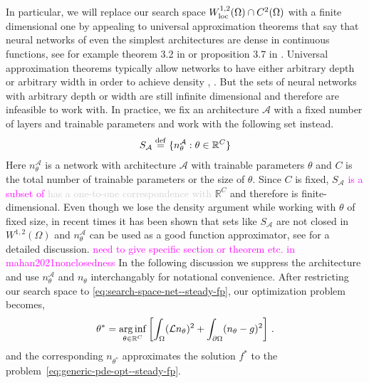 In particular, we will replace our search space $W^{1,2}_{\rm loc}(\Omega)\cap  C^2(\Omega)$ with a finite dimensional one by appealing to universal approximation theorems that say that neural networks of even the simplest architectures are dense in continuous functions, see for example theorem 3.2 in \cite{kidger2020universal} or proposition 3.7 in \cite{pinkus1999approximation}. Universal approximation theorems typically allow networks to have either arbitrary depth or arbitrary width in order to achieve density \cite{pinkus1999approximation}, \cite{de2021approximation}. But the sets of neural networks with arbitrary depth or width are still infinite dimensional and therefore are infeasible to work with. In practice, we fix an architecture $\mathcal A$ with a fixed number of layers and trainable parameters and work with the following set instead.
\begin{align}
    S_{\mathcal A}\stackrel{\rm def}{=}\{n^{\mathcal A}_\theta: \theta\in \mathbb R^C\}\label{eq:search-space-net--steady-fp}
\end{align}
Here $n^{\mathcal A}_\theta$ is a network with architecture $\mathcal A$ with trainable parameters $\theta$ and $C$ is the total number of trainable parameters or the size of $\theta$. Since $C$ is fixed, $S_{\mathcal A}$ \textcolor{magenta}{is a subset of} \textcolor{lightgray}{has a one-to-one correspondence with} $\mathbb R^C$ and therefore is finite-dimensional. Even though we lose the density argument while working with $\theta$ of fixed size, in recent times it has been shown that sets like $S_\mathcal A$ are not closed in $W^{1, 2}(\Omega)$ and $n^{\mathcal A}_\theta$ can be used as a good function approximator, see \cite{mahan2021nonclosedness} for a detailed discussion. \textcolor{magenta}{need to give specific section or theorem etc. in mahan2021nonclosedness} In the following discussion we suppress the architecture and use $n^{\mathcal A}_\theta$ and $n_\theta$ interchangably for notational convenience. After restricting our search space to \eqref{eq:search-space-net--steady-fp},  our optimization problem becomes,
\begin{align}
    \theta^* = \underset{\theta\in\mathbb R^C}{\rm arg\,inf}\left[\int_{\Omega} (\mathcal L n_\theta)^2 + \int_{\partial\Omega}(n_\theta-g)^2\right] \,.\label{eq:generic-pde-opt-theta--steady-fp}
\end{align}
and the corresponding $n_{\theta^*}$ approximates the solution $f^*$ to the problem~\eqref{eq:generic-pde-opt--steady-fp}.

